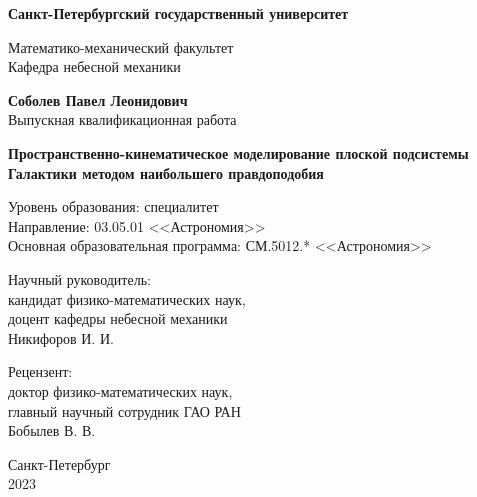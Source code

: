 \documentclass[a4paper, oneside, 14pt]{article}
\newcommand{\npar}{\par\vspace{\baselineskip}}
\begin{document}
\begin{titlepage}
  \begin{center}
    {
      \Large
      \textbf{Санкт-Петербургский государственный университет}

      Математико-механический факультет\\
      Кафедра небесной механики\par
    }

    \vfill

    {
      \Large
      \textbf{Соболев Павел Леонидович}\\
      Выпускная квалификационная работа\par
    }

    \vspace{0.5cm}

    {
      \LARGE
      \textbf{Пространственно-кинематическое моделирование плоской подсистемы Галактики методом наибольшего правдоподобия}
    }

    \vspace{0.5cm}

    {
      \Large

      Уровень образования: специалитет\\
      Направление: 03.05.01 <<Астрономия>>\\
      Основная образовательная программа: СМ.5012.* <<Астрономия>>\par
    }

    \vfill

    \begin{flushright}
      \large

      Научный руководитель:\\
      кандидат физико-математических наук,\\
      доцент кафедры небесной механики\\
      Никифоров И. И.\npar

      Рецензент:\\
      доктор физико-математических наук,\\
      главный научный сотрудник ГАО РАН\\
      Бобылев В. В.\par

    \end{flushright}

    \vfill

    {
      \Large
      Санкт-Петербург\\
      2023\par
    }
  \end{center}
\end{titlepage}
\end{document}
